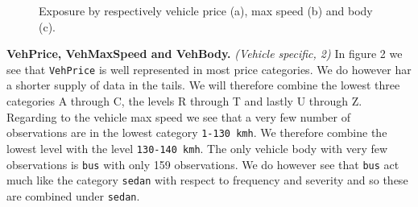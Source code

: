 \documentclass[
]{article}
\begin{document}
\begin{figure}[h]
    \centering
    \qquad
    \qquad
    \caption{Exposure by respectively vehicle price (a), max speed (b) and body (c).}
\end{figure}

\textbf{VehPrice, VehMaxSpeed and VehBody.} \emph{(Vehicle specific, 2)}
In figure 2 we see that \texttt{VehPrice} is well represented in most
price categories. We do however har a shorter supply of data in the
tails. We will therefore combine the lowest three categories A through
C, the levels R through T and lastly U through Z. Regarding to the
vehicle max speed we see that a very few number of observations are in
the lowest category \texttt{1-130\ kmh}. We therefore combine the lowest
level with the level \texttt{130-140\ kmh}. The only vehicle body with
very few observations is \texttt{bus} with only 159 observations. We do
however see that \texttt{bus} act much like the category \texttt{sedan}
with respect to frequency and severity and so these are combined under
\texttt{sedan}.
\end{document}
